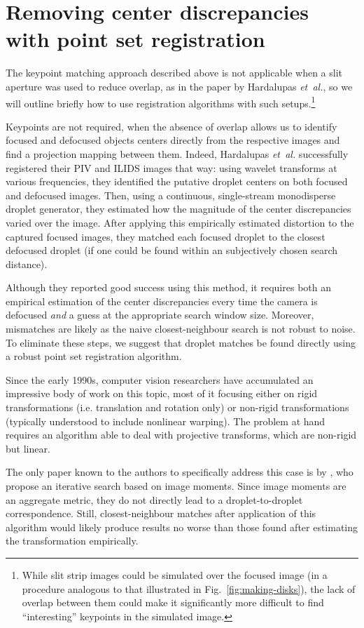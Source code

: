 \documentclass[11.5pt,oneside]{book}
\newcommand*{\figref}[1]{Fig.~\ref{#1}}
\begin{document}
\section{Removing center discrepancies with point set registration}
\label{sec:point-set-registration}
The keypoint matching approach described above is not applicable when a slit
aperture was used to reduce overlap, as in the paper by Hardalupas
\emph{et~al.}, so we will outline briefly how to use registration algorithms
with such setups.\footnote{While slit strip images could be
simulated over the focused image (in a procedure analogous to that illustrated
in \figref{fig:making-disks}), the lack of overlap between them could make it
significantly more difficult to find ``interesting'' keypoints in the simulated
image.}

Keypoints are not required, when the absence of overlap allows
us to identify focused and defocused objects centers directly from the respective
images and find a projection mapping between them. Indeed, Hardalupas
\emph{et~al.} successfully registered their PIV and ILIDS images that way: using
wavelet transforms at various frequencies, they identified the putative droplet
centers on both focused and defocused images.  Then, using a continuous,
single-stream monodisperse droplet generator, they estimated how the magnitude
of the center discrepancies varied over the image.  After applying this
empirically estimated distortion to the captured focused images, they matched each
focused droplet to the closest defocused droplet (if one could be found within an
subjectively chosen search distance).

Although they reported good success using this method, it requires both an
empirical estimation of the center discrepancies every time the camera is
defocused \emph{and} a guess at the appropriate search window size. Moreover,
mismatches are likely as the naive closest-neighbour search is not robust to
noise. To eliminate these steps, we suggest that droplet matches be found
directly using a robust point set registration algorithm.

Since the early 1990s, computer vision researchers have accumulated an
impressive body of work on this topic, most of it focusing either
on rigid transformations (i.e. translation and rotation only) or non-rigid
transformations (typically understood to include nonlinear warping). The problem
at hand requires an algorithm able to deal with projective transforms, which
are non-rigid but linear.

The only paper known to the authors to specifically address this case is by
\citet{Chi11}, who propose an iterative search based on image moments. Since
image moments are an aggregate metric, they do not directly lead to a
droplet-to-droplet correspondence. Still, closest-neighbour matches after
application of this algorithm would likely produce results no worse than those
found after estimating the transformation empirically.
\end{document}
